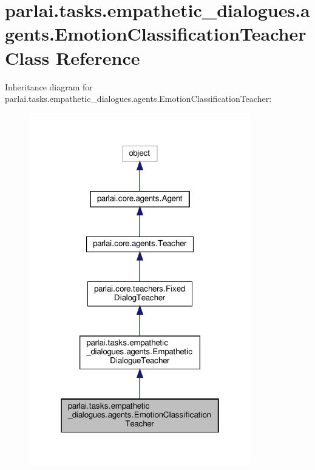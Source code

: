 \hypertarget{classparlai_1_1tasks_1_1empathetic__dialogues_1_1agents_1_1EmotionClassificationTeacher}{}\section{parlai.\+tasks.\+empathetic\+\_\+dialogues.\+agents.\+Emotion\+Classification\+Teacher Class Reference}
\label{classparlai_1_1tasks_1_1empathetic__dialogues_1_1agents_1_1EmotionClassificationTeacher}


Inheritance diagram for parlai.\+tasks.\+empathetic\+\_\+dialogues.\+agents.\+Emotion\+Classification\+Teacher\+:
\nopagebreak
\begin{figure}[H]
\begin{center}
\leavevmode
\includegraphics[width=274pt]{d2/d20/classparlai_1_1tasks_1_1empathetic__dialogues_1_1agents_1_1EmotionClassificationTeacher__inherit__graph}
\end{center}
\end{figure}


